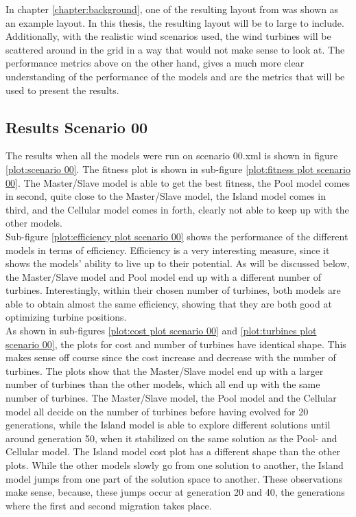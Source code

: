 \noindent In chapter \ref{chapter:background}, one of the resulting layout from \citep{Grady} was shown as an example layout. In this thesis, the resulting layout will be to large to include. Additionally, with the realistic wind scenarios used, the wind turbines will be scattered around in the grid in a way that would not make sense to look at. The performance metrics above on the other hand, gives a much more clear understanding of the performance of the models and are the metrics that will be used to present the results.\\


\subsection{Results Scenario 00}
The results when all the models were run on scenario 00.xml is shown in figure \ref{plot:scenario 00}. The fitness plot is shown in sub-figure \ref{plot:fitness plot scenario 00}. The Master/Slave model is able to get the best fitness, the Pool model comes in second, quite close to the Master/Slave model, the Island model comes in third, and the Cellular model comes in forth, clearly not able to keep up with the other models.\\ 


\noindent Sub-figure \ref{plot:efficiency plot scenario 00} shows the performance of the different models in terms of efficiency. Efficiency is a very interesting measure, since it shows the models' ability to live up to their potential. As will be discussed below, the Master/Slave model and Pool model end up with a different number of turbines. Interestingly, within their chosen number of turbines, both models are able to obtain almost the same efficiency, showing that they are both good at optimizing turbine positions.\\


\noindent As shown in sub-figures \ref{plot:cost plot scenario 00} and \ref{plot:turbines plot scenario 00}, the plots for cost and number of turbines have identical shape. This makes sense off course since the cost increase and decrease with the number of turbines. The plots show that the Master/Slave model end up with a larger number of turbines than the other models, which all end up with the same number of turbines. The Master/Slave model, the Pool model and the Cellular model all decide on the number of turbines before having evolved for 20 generations, while the Island model is able to explore different solutions until around generation 50, when it stabilized on the same solution as the Pool- and Cellular model. The Island model cost plot has a different shape than the other plots. While the other models slowly go from one solution to another, the Island model jumps from one part of the solution space to another. These observations make sense, because, these jumps occur at generation 20 and 40, the generations where the first and second migration takes place. 

